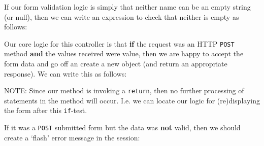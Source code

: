 \documentclass[a4paperpaper,openright]{book}
\newenvironment{Shaded}{}{}
\newcommand{\CommentTok}[1]{\textcolor[rgb]{0.38,0.63,0.69}{\textit{#1}}}
\newcommand{\KeywordTok}[1]{\textcolor[rgb]{0.00,0.44,0.13}{\textbf{#1}}}
\newcommand{\NormalTok}[1]{#1}
\newcommand{\OtherTok}[1]{\textcolor[rgb]{0.00,0.44,0.13}{#1}}
\newcommand{\StringTok}[1]{\textcolor[rgb]{0.25,0.44,0.63}{#1}}
\begin{document}
If our form validation logic is simply that neither name can be an empty
string (or null), then we can write an expression to check that neither
is empty as follows:

\begin{Shaded}
\end{Shaded}

Our core logic for this controller is that \textbf{if} the request was
an HTTP \texttt{POST} method \textbf{and} the values received were
value, then we are happy to accept the form data and go off an create a
new object (and return an appropriate response). We can write this as
follows:

\begin{Shaded}
\end{Shaded}

NOTE: Since our method is invoking a \texttt{return}, then no further
processing of statements in the method will occur. I.e. we can locate
our logic for (re)displaying the form after this \texttt{if}-test.

If it was a \texttt{POST} submitted form but the data was \textbf{not}
valid, then we should create a `flash' error message in the session:

\begin{Shaded}
\end{Shaded}
\end{document}

